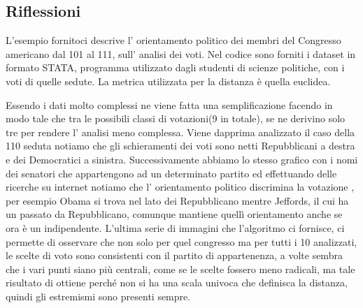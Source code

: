 			\subsection{Riflessioni }		
				L'esempio fornitoci descrive l' orientamento politico dei membri del Congresso americano dal 101 al 111, sull' analisi dei voti.
				Nel codice sono forniti i dataset in formato STATA, programma utilizzato dagli studenti di scienze politiche, con i voti di quelle sedute. 
				La metrica utilizzata per la distanza è quella euclidea.
				
				
				Essendo i dati molto complessi ne viene fatta una semplificazione facendo in modo tale che tra le possibili classi di votazioni(9 in totale), se ne derivino solo tre per rendere l' analisi meno complessa.
				Viene dapprima analizzato il caso della 110 seduta notiamo che gli schieramenti dei voti sono netti Repubblicani a destra e dei Democratici a sinistra.
				Successivamente abbiamo lo stesso grafico con i nomi dei senatori che appartengono ad un determinato partito ed effettuando delle ricerche su internet notiamo che l' orientamento politico discrimina la votazione , per esempio Obama si trova nel lato dei Repubblicano mentre Jeffords, il cui ha un passato da Repubblicano, comunque mantiene quellì orientamento anche se ora è un indipendente.
				L'ultima serie di immagini che l'algoritmo ci fornisce, ci permette di osservare che non solo per quel congresso ma per tutti i 10 analizzati, le scelte di voto sono consistenti con il partito di appartenenza, a volte sembra che i vari punti siano più centrali, come se le scelte fossero meno radicali, ma tale risultato di ottiene perché non si ha una scala univoca che definisca la distanza, quindi gli estremismi sono presenti sempre.
